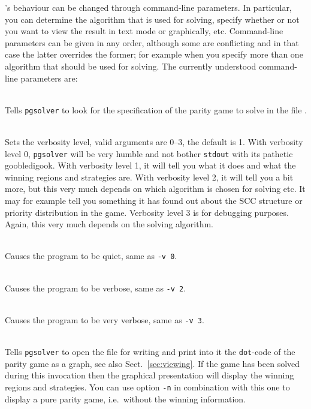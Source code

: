 \pgsolver's behaviour can be changed through command-line parameters. In particular, you can determine
the algorithm that is used for solving, specify whether or not you want to view the result in text
mode or graphically, etc. Command-line parameters can be given in any order, although some are
conflicting and in that case the latter overrides the former; for example when you specify more than
one algorithm that should be used for solving. The currently understood command-line parameters are:
\begin{description}
\itemsep3mm
\item[\nonterminal{filename}] \ \\
   Tells \texttt{pgsolver} to look for the specification of the parity game to solve in the file
   .

\item[{\tt  -v \nonterminal{level}}] \ \\
   Sets the verbosity level, valid arguments are $0$--$3$, the default is 1. With verbosity level $0$,
   \texttt{pgsolver} will be very humble and not bother \texttt{stdout} with its pathetic goobledigook.
   With verbosity level 1, it will tell you what it does and what the winning regions and strategies
   are. With verbosity level 2, it will tell you a bit more, but this very much depends on which
   algorithm is chosen for solving etc. It may for example tell you something it has found out about the
   SCC structure or priority distribution in the game. Verbosity level 3 is for debugging purposes. Again,
   this very much depends on the solving algorithm.

\item[{\tt --quiet}] \ \\
   Causes the program to be quiet, same as \texttt{-v 0}.

\item[{\tt --verbose}] \ \\
   Causes the program to be verbose, same as \texttt{-v 2}.

\item[{\tt --debug}] \ \\
   Causes the program to be very verbose, same as \texttt{-v 3}.

\item[{\tt -d \nonterminal{filename}}] \ \\
   Tells \texttt{pgsolver} to open the file  for writing and print into it the
   \texttt{dot}-code of the parity game as a graph, see also Sect.~\ref{sec:viewing}. If the game has
   been solved during this invocation then the graphical presentation will display the winning regions
   and strategies. You can use option \texttt{-n} in combination with this one to display a pure parity
   game, i.e.\ without the winning information.


\end{description}
